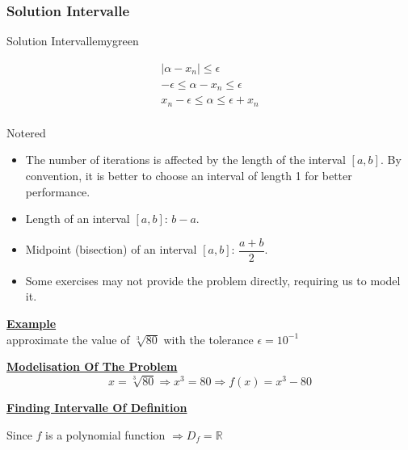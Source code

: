 \subsubsection{Solution Intervalle}
\begin{prettyBox}{Solution Intervalle}{mygreen}
    \begin{center}
    \[
    \begin{gathered}
        |\alpha - x_n| \leq \epsilon \\[0.3cm]
        -\epsilon \leq \alpha - x_n \leq \epsilon \\[0.3cm]
        \boxed{x_n - \epsilon \leq \alpha \leq \epsilon + x_n}\\[0.3cm]
    \end{gathered}
    \]
    \end{center}
\end{prettyBox}


\vspace{0.5cm}

\begin{prettyBox}{Note}{red}
\begin{itemize}
    \item The number of iterations is affected by the length of the interval \([a, b]\).  
          By convention, it is better to choose an interval of length 1 for better performance.
    \item Length of an interval \([a, b]\): \(b - a\).
    \item Midpoint (bisection) of an interval \([a, b]\): \(\dfrac{a + b}{2}\).
\item Some exercises may not provide the problem directly, requiring us to model it.
\end{itemize}
\end{prettyBox}

\vspace{1cm}

\textbf{\underline{Example}}\\[0.2cm]
approximate the value of \(\sqrt[3]{80}\) with the tolerance \(\epsilon = 10^{-1}\)

\vspace{1cm}

\textbf{\underline{Modelisation Of The Problem}}\\[0.2cm]
\[x = \sqrt[3]{80} \Rightarrow x^3 = 80 \Rightarrow \boxed{f(x) = x^3 - 80}\]

\vspace{1cm}
\textbf{\underline{Finding Intervalle Of Definition}}\\[0.2cm]
\begin{center}
Since \(f\) is a polynomial function \(\Rightarrow \boxed{D_f = \mathbb{R}}\)
\end{center}

